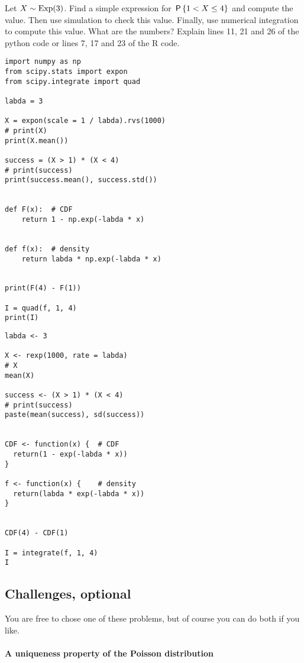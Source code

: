 \documentclass[assignments]{subfiles}
\begin{document}
\begin{exercise}
Let $X\sim\Exp{3}$.
Find a simple expression for $\P{1 < X \leq 4}$ and compute the value.
Then use simulation to check this value.
Finally, use numerical integration to compute this value. What are the numbers? Explain lines 11, 21 and 26 of the python code or lines 7, 17 and 23 of the R code.

\begin{verbatim}
import numpy as np
from scipy.stats import expon
from scipy.integrate import quad

labda = 3

X = expon(scale = 1 / labda).rvs(1000)
# print(X)
print(X.mean())

success = (X > 1) * (X < 4)
# print(success)
print(success.mean(), success.std())


def F(x):  # CDF
    return 1 - np.exp(-labda * x)


def f(x):  # density
    return labda * np.exp(-labda * x)


print(F(4) - F(1))

I = quad(f, 1, 4)
print(I)
\end{verbatim}



\begin{verbatim}
labda <- 3

X <- rexp(1000, rate = labda)
# X
mean(X)

success <- (X > 1) * (X < 4)
# print(success)
paste(mean(success), sd(success))


CDF <- function(x) {  # CDF
  return(1 - exp(-labda * x))
}

f <- function(x) {    # density
  return(labda * exp(-labda * x))
}


CDF(4) - CDF(1)

I = integrate(f, 1, 4)
I
\end{verbatim}


\end{exercise}


\subsection{Challenges, optional}
\label{sec:above-exam-level}

You are free to chose one of these problems, but of course you can do both if you like.

\paragraph{A uniqueness property of the Poisson distribution}
\end{document}
